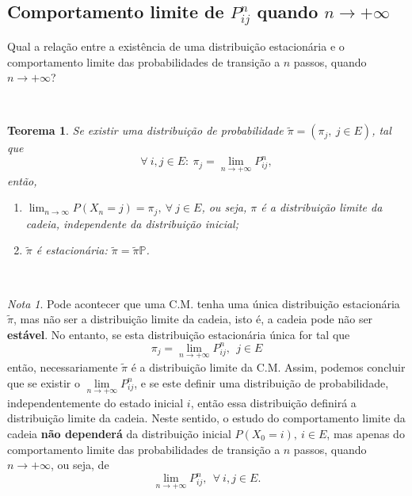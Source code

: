 \documentclass[
  11pt,
  a4paper,
]{book}
\newtheorem{theorem}{Teorema}[chapter]
\theoremstyle{definition}
\theoremstyle{definition}
\theoremstyle{definition}
\theoremstyle{definition}
\theoremstyle{remark}
\newtheorem*{remark}{Nota }
\begin{document}
\subsection{\texorpdfstring{Comportamento limite de \(P_{ij}^n\) quando \(n\to+\infty\)}{Comportamento limite de P\_\{ij\}\^{}n quando n\textbackslash to+\textbackslash infty}}\label{comportamento-limite-de-p-ij-n-quando-n-to-infty}

Qual a relação entre a existência de uma distribuição estacionária e o comportamento limite das probabilidades de transição a \(n\) passos, quando \(n \to +\infty\)?

\(\,\)

\begin{theorem}

Se existir uma distribuição de probabilidade \(\tilde{\pi}=(\pi_j, ~j \in E)\), tal que
\[\forall ~i,j \in E: ~ \pi_j=\lim\limits_{n \to +\infty} P_{ij}^n,\]
então,

\begin{enumerate}
\def\labelenumi{(\roman{enumi})}
\item
  \(\displaystyle \lim_{n\to\infty} P(X_n=j) = \pi_j, ~\forall ~ j \in E\), ou seja, \(\pi\) é a distribuição limite da cadeia, independente da distribuição inicial;
\item
  \(\tilde\pi\) é estacionária: \(\tilde\pi = \tilde\pi \mathbb{P}\).
\end{enumerate}

\end{theorem}

\(\,\)

\begin{remark}
Pode acontecer que uma C.M. tenha uma única distribuição estacionária \(\tilde{\pi}\), mas não ser a distribuição limite da cadeia, isto é, a cadeia pode não ser \textbf{estável}. No entanto, se esta distribuição estacionária única for tal que
\[\pi_j=\lim\limits_{n \to +\infty} P_{ij}^n, ~~j \in E\]
então, necessariamente \(\tilde{\pi}\) é a distribuição limite da C.M. Assim, podemos concluir que se existir o \(\lim\limits_{n \to +\infty} P_{ij}^n\), e se este definir uma distribuição de probabilidade, independentemente do estado inicial \(i\), então essa distribuição definirá a distribuição limite da cadeia. Neste sentido, o estudo do comportamento limite da cadeia \textbf{não dependerá} da distribuição inicial \(P(X_0=i), ~i \in E\), mas apenas do comportamento limite das probabilidades de transição a \(n\) passos, quando \(n \to +\infty\), ou seja, de
\[\lim\limits_{n \to +\infty} P_{ij}^n, ~~ \forall ~ i,j \in E.\]
\end{remark}
\end{document}
